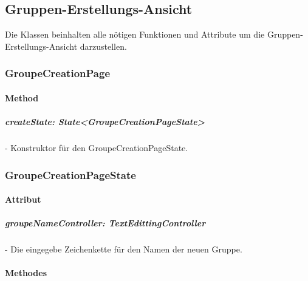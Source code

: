 \documentclass[parskip=full]{scrartcl}
\begin{document}
    \newpage

\subsection{Gruppen-Erstellungs-Ansicht}
    Die Klassen beinhalten alle nötigen Funktionen und Attribute um die Gruppen-Erstellungs-Ansicht darzustellen.

    \subsubsection{GroupeCreationPage}
        \paragraph*{Method}
            \subparagraph*{createState: State<GroupeCreationPageState>} - Konstruktor für den GroupeCreationPageState.
    
    \subsubsection{GroupeCreationPageState}
        \paragraph*{Attribut}
            \subparagraph*{groupeNameController: TextEdittingController} - Die eingegebe Zeichenkette für den Namen der neuen Gruppe.

        \paragraph*{Methodes}
\end{document}
